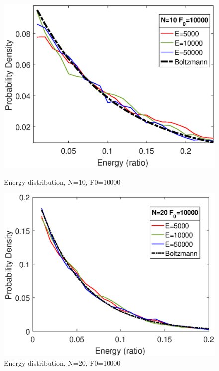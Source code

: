 \documentclass[aps,pre,twocolumn,groupedaddress]{revtex4-1}
\begin{document}
\begin{figure}[hbtp]
\centering

\includegraphics[scale=0.5]{ZhiyuPictures/boltzmann_N=10_F=10000_pre_rev.eps}
\caption{Energy distribution, N=10, F0=10000}
\label{fig:thermalization9}

\includegraphics[scale=0.5]{ZhiyuPictures/boltzmann_N=20_F=10000_pre_rev.eps} 
\caption{Energy distribution, N=20, F0=10000}
\label{fig:thermalization10}
\end{figure}
\end{document}
